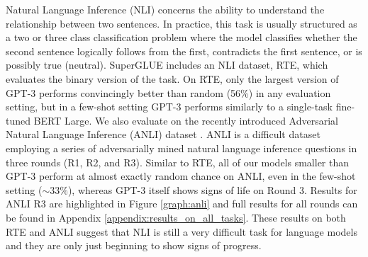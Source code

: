Natural Language Inference (NLI) \cite{fyodorov2000natural} concerns the ability to understand the relationship between two sentences. In practice, this task is usually structured as a two or three class classification problem where the model classifies whether the second sentence logically follows from the first, contradicts the first sentence, or is possibly true (neutral). SuperGLUE includes an NLI dataset, RTE, which evaluates the binary version of the task. On RTE, only the largest version of GPT-3 performs convincingly better than random (56\%) in any evaluation setting, but in a few-shot setting GPT-3 performs similarly to a single-task fine-tuned BERT Large. We also evaluate on the recently introduced Adversarial Natural Language Inference (ANLI) dataset \cite{nie2019adversarial}. ANLI is a difficult dataset employing a series of adversarially mined natural language inference questions in three rounds (R1, R2, and R3). Similar to RTE, all of our models smaller than GPT-3 perform at almost exactly random chance on ANLI, even in the few-shot setting ($\sim33\%$), whereas GPT-3 itself shows signs of life on Round 3. Results for ANLI R3 are highlighted in Figure \ref{graph:anli} and full results for all rounds can be found in Appendix \ref{appendix:results_on_all_tasks}. These results on both RTE and ANLI suggest that NLI is still a very difficult task for language models and they are only just beginning to show signs of progress.